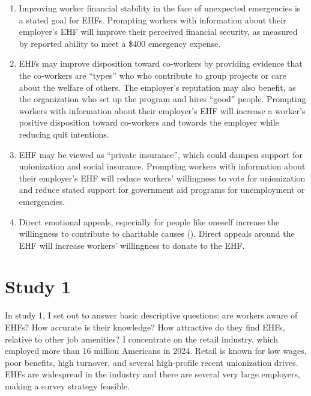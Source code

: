 \documentclass[
  11pt,
  oneside]{article}
\providecommand{\tightlist}{%
  \setlength{\itemsep}{0pt}\setlength{\parskip}{0pt}}
\begin{document}
\begin{enumerate}
\def\labelenumi{\arabic{enumi}.}
\tightlist
\item
  Improving worker financial stability in the face of unexpected emergencies is a stated goal for EHFs. Prompting workers with information about their employer's EHF will improve their perceived financial security, as measured by reported ability to meet a \$400 emergency expense.
\item
  EHFs may improve disposition toward co-workers by providing evidence that the co-workers are ``types'' who who contribute to group projects or care about the welfare of others. The employer's reputation may also benefit, as the organization who set up the program and hires ``good'' people. Prompting workers with information about their employer's EHF will increase a worker's positive disposition toward co-workers and towards the employer while reducing quit intentions.
\item
  EHF may be viewed as ``private insurance'', which could dampen support for unionization and social insurance. Prompting workers with information about their employer's EHF will reduce workers' willingness to vote for unionization and reduce stated support for government aid programs for unemployment or emergencies.
\item
  Direct emotional appeals, especially for people like oneself increase the willingness to contribute to charitable causes (). Direct appeals around the EHF will increase workers' willingness to donate to the EHF.
\end{enumerate}

\section{Study 1}\label{study-1}

In study 1, I set out to answer basic descriptive questions: are workers aware of EHFs? How accurate is their knowledge? How attractive do they find EHFs, relative to other job amenities? I concentrate on the retail industry, which employed more than 16 million Americans in 2024. Retail is known for low wages, poor benefits, high turnover, and several high-profile recent unionization drives. EHFs are widespread in the industry and there are several very large employers, making a survey strategy feasible.
\end{document}
